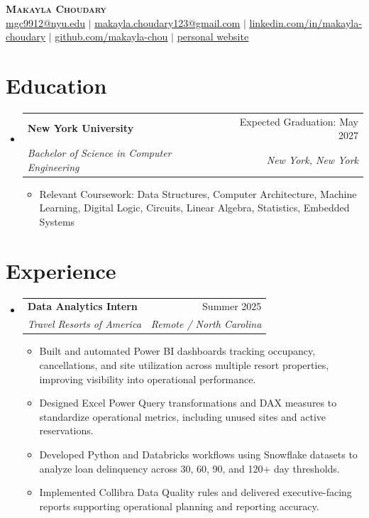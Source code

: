 \documentclass[letterpaper,10pt]{article}
\newcommand{\resumeItem}[1]{
  \item\small{#1}
}
\newcommand{\resumeSubheading}[4]{
  \item
  \begin{tabularx}{0.97\textwidth}[t]{Xr}
    \textbf{#1} & #2 \\
    \textit{\small #3} & \textit{\small #4} \\
  \end{tabularx}\vspace{-5pt}
}
\newcommand{\resumeSubHeadingListStart}{
  \begin{itemize}[leftmargin=0.15in, label={}, itemsep=3pt, topsep=2pt]
}
\newcommand{\resumeSubHeadingListEnd}{\end{itemize}}
\newcommand{\resumeItemListStart}{
  \begin{itemize}[leftmargin=0.22in, itemsep=1.5pt, topsep=3pt]
}
\newcommand{\resumeItemListEnd}{\end{itemize}\vspace{-3pt}}
\begin{document}
\begin{center}
    \textbf{\Huge \scshape \color{accent} Makayla Choudary} \\ \vspace{2pt}
    \small \href{mailto:mgc9912@nyu.edu}{\underline{mgc9912@nyu.edu}} $|$
    \small \href{mailto:makayla.choudary123@gmail.com}{\underline{makayla.choudary123@gmail.com}} $|$
    \href{https://linkedin.com/in/makayla-choudary}{\underline{linkedin.com/in/makayla-choudary}} $|$
    \href{https://github.com/makayla-chou}{\underline{github.com/makayla-chou}} $|$
    \href{https://makayla-chou.github.io/personal_website/}{\underline{personal website}}
\end{center}

\section{Education}
\resumeSubHeadingListStart
  \resumeSubheading
    {New York University}
    {Expected Graduation: May 2027}
    {Bachelor of Science in Computer Engineering}
    {New York, New York}
  \resumeItemListStart
    \resumeItem{Relevant Coursework: Data Structures, Computer Architecture, Machine Learning, Digital Logic, Circuits, Linear Algebra, Statistics, Embedded Systems}
  \resumeItemListEnd
\resumeSubHeadingListEnd

\section{Experience}
\resumeSubHeadingListStart
  \resumeSubheading
    {Data Analytics Intern}
    {Summer 2025}
    {Travel Resorts of America}
    {Remote / North Carolina}
  \resumeItemListStart
    \resumeItem{Built and automated Power BI dashboards tracking occupancy, cancellations, and site utilization across multiple resort properties, improving visibility into operational performance.}
    \resumeItem{Designed Excel Power Query transformations and DAX measures to standardize operational metrics, including unused sites and active reservations.}
    \resumeItem{Developed Python and Databricks workflows using Snowflake datasets to analyze loan delinquency across 30, 60, 90, and 120+ day thresholds.}
    \resumeItem{Implemented Collibra Data Quality rules and delivered executive-facing reports supporting operational planning and reporting accuracy.}
  \resumeItemListEnd
\resumeSubHeadingListEnd
\end{document}
